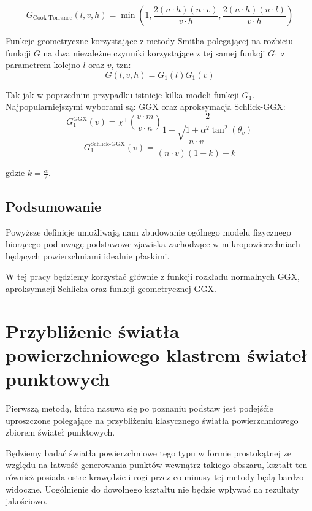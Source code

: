 \documentclass[../main.tex]{subfiles}
\begin{document}
\[
  G_{\text{Cook-Torrance}}(l,v,h) =
    \min \left(
      1,
      \frac{2(n \cdot h)(n \cdot v)}{
        v \cdot h
      },
      \frac{2(n \cdot h)(n \cdot l)}{
        v \cdot h
      }
    \right)
\]

Funkcje geometryczne korzystające z metody Smitha polegającej na rozbiciu
funkcji $G$ na dwa niezależne czynniki korzystające z tej samej funkcji $G_1$
z parametrem kolejno $l$ oraz $v$, tzn:
\[
  G(l,v,h) = G_1(l) G_1(v)
\]

Tak jak w poprzednim przypadku istnieje kilka modeli funkcji $G_1$.
Najpopularniejszymi wyborami są: GGX oraz aproksymacja Schlick-GGX:
\[
  G_{1}^{\text{GGX}}(v) =
    \chi^{+}\left(\frac{v \cdot m}{v \cdot n}\right)
    \frac{2}{
      1 + \sqrt{
        1 + \alpha^2 \tan^{2}\left(\theta_v\right)
      }
    }
\]
\[
  G_{1}^{\text{Schlick-GGX}}(v) =
    \frac{n \cdot v}{
      (n \cdot v)(1 - k) + k
    }
\]

gdzie $k = \frac{\alpha}{2}$.

\subsection{Podsumowanie}

Powyższe definicje umożliwają nam zbudowanie ogólnego modelu fizycznego
biorącego pod uwagę podstawowe zjawiska zachodzące w mikropowierzchniach
będących powierzchniami idealnie płaskimi.

W tej pracy będziemy korzystać głównie z funkcji rozkładu normalnych GGX,
aproksymacji Schlicka oraz funkcji geometrycznej GGX.


\section{Przybliżenie światła powierzchniowego klastrem świateł punktowych}

Pierwszą metodą, która nasuwa się po poznaniu podstaw jest podejśćie
uproszczone polegające na przybliżeniu klasycznego światła powierzchniowego
zbiorem świateł punktowych.

Będziemy badać światła powierzchniowe tego typu w formie prostokątnej ze względu
na łatwość generowania punktów wewnątrz takiego obszaru, kształt ten również
posiada ostre krawędzie i rogi przez co minusy tej metody będą bardzo widoczne.
Uogólnienie do dowolnego kształtu nie będzie wpływać na rezultaty jakościowo.
\end{document}
